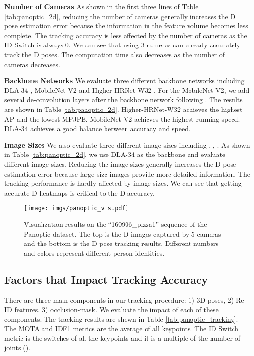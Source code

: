\vspace{0.5em}
\noindent
\textbf{Number of Cameras }
As shown in the first three lines of Table \ref{tab:panoptic_2d}, reducing the number of cameras generally increases the D pose estimation error because the information in the feature volume becomes less complete. The tracking accuracy is less affected by the number of cameras as the ID Switch is always 0. We can see that using 3 cameras can already accurately track the D poses. The computation time also decreases as the number of cameras decreases. 

\vspace{0.5em}
\noindent 
\textbf{Backbone Networks}
We evaluate three different backbone networks including DLA-34 \cite{zhou2019objects}, MobileNet-V2 \cite{sandler2018mobilenetv2} and Higher-HRNet-W32 \cite{cheng2020bottom}. For the MobileNet-V2, we add several de-convolution layers after the backbone network following \cite{xiao2018simple}. The results are shown in Table \ref{tab:panoptic_2d}. Higher-HRNet-W32 achieves the highest AP and the lowest MPJPE. MobileNet-V2 achieves the highest running speed. DLA-34 achieves a good balance between accuracy and speed. 

\vspace{0.5em}
\noindent
\textbf{Image Sizes}
We also evaluate three different image sizes including , , . As shown in Table \ref{tab:panoptic_2d}, we use DLA-34 as the backbone and evaluate different image sizes. Reducing the image sizes generally increases the D pose estimation error because large size images provide more detailed information. The tracking performance is hardly affected by image sizes. We can see that getting accurate D heatmaps is critical to the D accuracy. 


\begin{figure*}
	\centering
	\texttt{[image: imgs/panoptic\_vis.pdf]}
	\caption{Visualization results on the ``160906\_pizza1'' sequence of the Panoptic dataset. The top is the D images captured by 5 cameras and the bottom is the D pose tracking results. Different numbers and colors represent different person identities. 
	}
	\label{fig:panoptic}
\end{figure*}


\subsection{Factors that Impact Tracking Accuracy }
There are three main components in our tracking procedure: 1) 3D poses, 2) Re-ID features, 3) occlusion-mask. We evaluate the impact of each of these components. The tracking results are shown in Table \ref{tab:panoptic_tracking}. The MOTA and IDF1 metrics are the average of all keypoints. The ID Switch metric is the switches of all the keypoints and it is a multiple of the number of joints (). 


